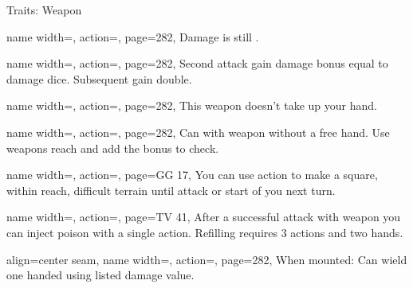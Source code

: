 \begin{PageBackLandscape}
\begin{TablesHalf}{\backTableHeight}
\begin{Table}{Traits: Weapon}
\begin{entry}{}{%
                name width=\conditionLength,%
                action=\Finesse,
                page=282,
            }
                Damage is still \Strength.
            \end{entry}
            \begin{entry}{}{%
                name width=\conditionLength,%
                action=\Forceful,
                page=282,
            }
                Second attack gain \Cirm damage bonus equal to damage dice.
                Subsequent gain double.
            \end{entry}
            \begin{entry}{}{%
                name width=\conditionLength,%
                action=\FreeHand,
                page=282,
            }
                This weapon doesn't take up your hand.\hfill
            \end{entry}
            \breakLine
            \begin{entry}{}{%
                name width=\conditionLength,%
                action=\Grapple,
                page=282,
            }
                Can  with weapon without a free hand.
                Use weapons reach and add the \Item bonus to check. \hfill
            \end{entry}
            \breakLine
            \begin{entry}{}{%
                name width=\conditionLength,%
                action=\Hampering,
                page=GG 17,
            }
                You can use  action to make a square, within reach, difficult terrain until attack or start of you next turn.
            \end{entry}
            \breakLine
            \begin{entry}{}{%
                name width=\conditionLength,%
                action=\Injection,
                page=TV 41,
            }
                After a successful attack with weapon you can inject poison with a single  action. \hfill
                Refilling requires 3  actions and two hands.
            \end{entry}
            \breakLine
            \begin{entry}{}{%
                align=center seam,
                name width=\conditionLength,%
                action=\Jousting,
                page=282,
            }
                When mounted: Can wield one handed using listed damage value. \hfill
                \\

\end{entry}
\end{Table}
\end{TablesHalf}
\end{PageBackLandscape}
